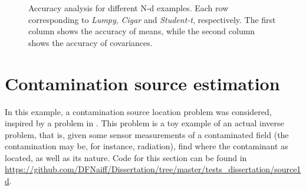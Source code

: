 \begin{figure}

	
	\caption[Accuracy analysis for different N-d examples.]{\label{ndtoy} Accuracy analysis for different N-d examples. Each row corresponding to \textit{Lumpy}, \textit{Cigar} and \textit{Student-t}, respectively. The first column shows the accuracy of means, while the second column shows the accuracy of covariances.}
\end{figure}

\section{Contamination source estimation}
In this example, a contamination source location problem was considered, inspired by a problem in \cite{Bilionis_2013}. This problem is a toy example of an actual inverse problem, that is, given some sensor measurements of a contaminated field (the contamination may be, for instance, radiation), find where the contaminant as located, as well as its nature. Code for this section can be found in \url{https://github.com/DFNaiff/Dissertation/tree/master/tests_dissertation/source1d}.

